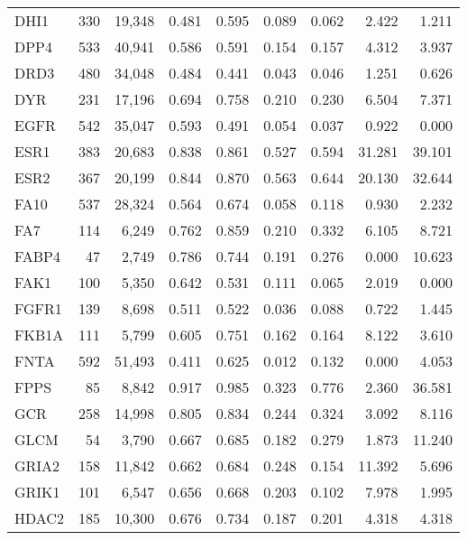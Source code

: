 \begin{center}
\begin{footnotesize}
\begin{longtable}{lrrrrrrrr}
			DHI1   & 330   & 19,348   & 0.481   & 0.595   & 0.089   & 0.062   & 2.422   & 1.211  \\
			DPP4   & 533   & 40,941   & 0.586   & 0.591   & 0.154   & 0.157   & 4.312   & 3.937  \\
			DRD3   & 480   & 34,048   & 0.484   & 0.441   & 0.043   & 0.046   & 1.251   & 0.626  \\
			DYR    & 231   & 17,196   & 0.694   & 0.758   & 0.210   & 0.230   & 6.504   & 7.371  \\
			EGFR   & 542   & 35,047   & 0.593   & 0.491   & 0.054   & 0.037   & 0.922   & 0.000  \\
			ESR1   & 383   & 20,683   & 0.838   & 0.861   & 0.527   & 0.594   & 31.281  & 39.101 \\
			ESR2   & 367   & 20,199   & 0.844   & 0.870   & 0.563   & 0.644   & 20.130  & 32.644 \\
			FA10   & 537   & 28,324   & 0.564   & 0.674   & 0.058   & 0.118   & 0.930   & 2.232  \\
			FA7    & 114   & 6,249    & 0.762   & 0.859   & 0.210   & 0.332   & 6.105   & 8.721  \\
			FABP4  & 47    & 2,749    & 0.786   & 0.744   & 0.191   & 0.276   & 0.000   & 10.623 \\
			FAK1   & 100   & 5,350    & 0.642   & 0.531   & 0.111   & 0.065   & 2.019   & 0.000  \\
			FGFR1  & 139   & 8,698    & 0.511   & 0.522   & 0.036   & 0.088   & 0.722   & 1.445  \\
			FKB1A  & 111   & 5,799    & 0.605   & 0.751   & 0.162   & 0.164   & 8.122   & 3.610  \\
			FNTA   & 592   & 51,493   & 0.411   & 0.625   & 0.012   & 0.132   & 0.000   & 4.053  \\
			FPPS   & 85    & 8,842    & 0.917   & 0.985   & 0.323   & 0.776   & 2.360   & 36.581 \\
			GCR    & 258   & 14,998   & 0.805   & 0.834   & 0.244   & 0.324   & 3.092   & 8.116  \\
			GLCM   & 54    & 3,790    & 0.667   & 0.685   & 0.182   & 0.279   & 1.873   & 11.240 \\
			GRIA2  & 158   & 11,842   & 0.662   & 0.684   & 0.248   & 0.154   & 11.392  & 5.696  \\
			GRIK1  & 101   & 6,547    & 0.656   & 0.668   & 0.203   & 0.102   & 7.978   & 1.995  \\
			HDAC2  & 185   & 10,300   & 0.676   & 0.734   & 0.187   & 0.201   & 4.318   & 4.318  \\

\end{longtable}
\end{footnotesize}
\end{center}
